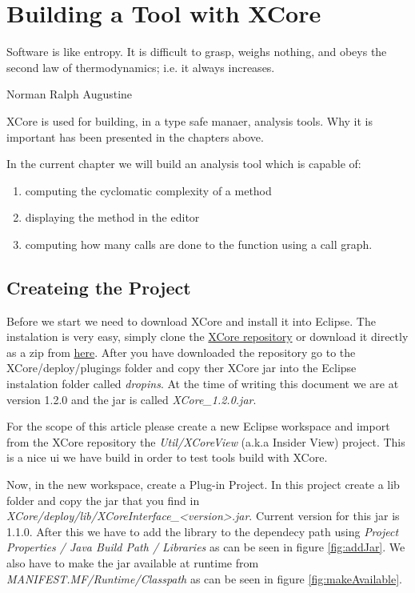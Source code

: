 \chapter{Building a Tool with XCore}

\epigraph{Software is like entropy. It is difficult to grasp, weighs nothing, and obeys the second law of thermodynamics; i.e. it always increases.}{Norman Ralph Augustine}

XCore is used for building, in a type safe manaer, analysis tools. Why it is important has been presented in the chapters above. 

In the current chapter we will build an analysis tool which is capable of:
        \begin{enumerate}
                \item computing the cyclomatic complexity of a method
                \item displaying the method in the editor
                \item computing how many calls are done to the function using a call graph.
        \end{enumerate}

\section{Createing the Project}

        Before we start we need to download XCore and install it into Eclipse. The instalation is very easy, simply clone the \href{https://github.com/SAlexandru/XCore}{XCore repository}
or download it directly as a zip from \href{https://github.com/SAlexandru/XCore/archive/master.zip}{here}. After you have downloaded the repository go to the XCore/deploy/plugings folder
and copy ther XCore jar into the Eclipse instalation folder called \textit{dropins}. At the time of writing this document we are at version 1.2.0 and the jar is called \textit{XCore\_1.2.0.jar}. 

        For the scope of this article please create a new Eclipse workspace and import from the XCore repository the \textit{Util/XCoreView} (a.k.a Insider View) project. This is a nice ui we have
build in order to test tools build with XCore.

        Now, in the new workspace, create a Plug-in Project. In this project create a lib folder and copy the jar that you find in \textit{XCore/deploy/lib/XCoreInterface\_<version>.jar}. Current version 
for this jar is 1.1.0. After this we have to add the library to the dependecy path using \textit{Project Properties / Java Build Path / Libraries} as can be seen in figure \ref{fig:addJar}. We
also have to make the jar available at runtime from \textit{MANIFEST.MF/Runtime/Classpath} as can be seen in figure \ref{fig:makeAvailable}. 

